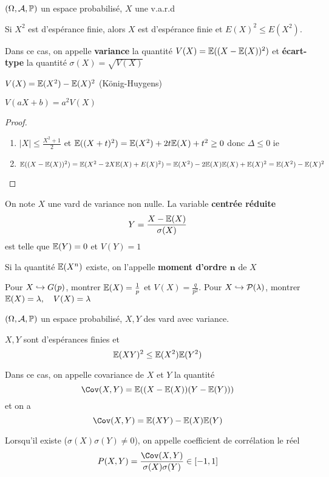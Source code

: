 \begin{thmdef}
    \Hyp $(\Omega, \mathcal  A, \P)$ un espace probabilisé, $X$ une v.a.r.d
     \begin{concenum}
     \item Si $X^2$ est d'espérance finie, alors  $X$ est d'espérance finie et  $E(X)^2\leq E(X^2)$.
     \item Dans ce cas, on appelle \textbf{variance} la quantité $V(X)=\E((X-\E(X))^2)$ et \textbf{écart-type} la quantité $\sigma(X)=\sqrt{V(X)}$ 
     \item $V(X)=\E(X^2)-\E(X)^2$ (König-Huygens)
     \item $V(aX+b)=a^2V(X)$
    \end{concenum}
\end{thmdef}

\begin{proof}~
\begin{enumerate}
    \item $|X|\leq \frac{X^2+1}{2}$ et $\E((X+t)^2)=\E(X^2)+2t\E(X)+t^2\geq 0$ donc $\Delta\leq 0$ ie \conc
    \item $\E((X-\E(X))^2)=\E(X^2-2X\E(X)+E(X)^2)=\E(X^2)-2\E(X)\E(X)+\E(X)^2=\E(X^2)-\E(X)^2$
\end{enumerate}
\end{proof}

\begin{rem}
On note $X$ une vard de variance non nulle. La variable \textbf{centrée réduite} \[
    Y=\frac{X-\E(X)}{\sigma(X)}
\] 
est telle que $\E(Y)=0$ et $V(Y)=1$
\end{rem}

\begin{rem}
    Si la quantité $\E(X^n)$ existe, on l'appelle \textbf{moment d'ordre $\bm n$} de $X$  
\end{rem}

\begin{exo}
    Pour $X\suit G(p)$, montrer  $\E(X)=\frac{1}{p}$ et $V(X)=\frac{q}{p^2}$. Pour $X\suit \mathcal  P(\lambda)$, montrer $ \E(X)=\lambda, \quad  V(X)=\lambda$
\end{exo}

\begin{thmdef}
    \Hyp $(\Omega, \mathcal  A, \P)$ un espace probabilisé, $X,Y$ des vard avec variance.
    \begin{concenum}
    \item $X,Y$ sont d'espérances finies et  \[
            \E(XY)^2\leq \E(X^2)\E(Y^2)
    \] 
\item Dans ce cas, on appelle covariance de $X$ et $Y$ la quantité \[
        \Cov(X,Y)=\E((X-\E(X))(Y-\E(Y)))
\] 
et on a \[
    \Cov(X,Y)=\E(XY)-\E(X)\E(Y)
\] 
\item Lorsqu'il existe ($\sigma(X)\sigma(Y)\neq 0$), on appelle coefficient de corrélation le réel \[
        P(X,Y)=\frac{\Cov(X,Y)}{\sigma(X)\sigma(Y)}\in [-1, 1]
\]
    \end{concenum}
\end{thmdef}


